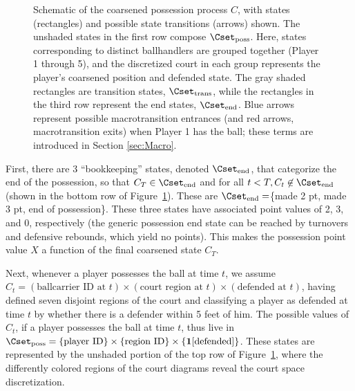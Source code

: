 \documentclass[EPV_JASA.tex]{subfiles}
\begin{document}
\begin{figure}[!ht]

\caption{Schematic of the coarsened possession process $C$, with states (rectangles) and possible state transitions (arrows) shown. The unshaded states in the first row compose $\Cset_{\text{poss}}$. Here, states corresponding to distinct ballhandlers are grouped together (Player 1 through 5), and the discretized court in each group represents the player's coarsened position and defended state. The gray shaded rectangles are transition states, $\Cset_{\text{trans}}$, while the rectangles in the third row represent the end states, $\Cset_{\text{end}}$. Blue arrows represent possible macrotransition entrances (and red arrows, macrotransition exits) when Player 1 has the ball; these terms are introduced in Section \ref{sec:Macro}.}
\label{fig:states}
\end{figure}

First, there are 3 ``bookkeeping'' states, denoted $\Cset_{\text{end}}$, that categorize the end of the possession, so that $C_T \in \Cset_{\text{end}}$ and for all $t < T, C_t \not \in \Cset_{\text{end}}$ (shown in the bottom row of Figure~\ref{fig:states}). These are $\Cset_{\text{end}} = $\{made 2 pt, made 3 pt, end of possession\}.
These three states have associated point values of 2, 3, and 0, respectively (the generic possession end state can be reached by turnovers and defensive rebounds, which yield no points). This makes the possession point value $X$ a function of the final coarsened state $C_T$.

Next, whenever a player possesses the ball at time $t$, we assume $C_t = (\text{ballcarrier ID at }t) \times (\text{court region at }t) \times (\text{defended at }t)$, having defined seven disjoint regions of the court and classifying a player as defended at time $t$ by whether there is a defender within 5 feet of him. The possible values of $C_t$, if a player possesses the ball at time $t$, thus live in $\Cset_{\text{poss}} = \{\text{player ID}\} \times \{\text{region ID}\} \times \{\mathbf{1}[\text{defended}]\}$. These states are represented by the unshaded portion of the top row of Figure~\ref{fig:states}, where the differently colored regions of the court diagrams reveal the court space discretization.
\end{document}
